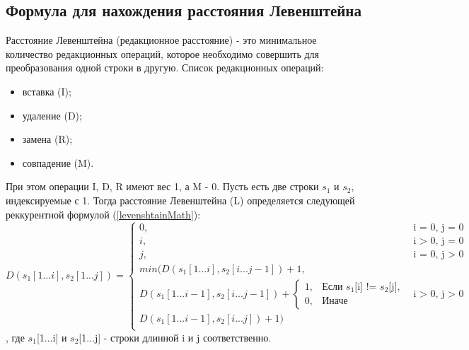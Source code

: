 \documentclass{article}
\begin{document}
		\subsection{Формула для нахождения расстояния Левенштейна}
		Расстояние Левенштейна (редакционное расстояние) - это минимальное количество редакционных операций, которое необходимо совершить для преобразования одной строки в другую.
		\newline
		\indent Список редакционных операций:
		\begin{itemize}
		\item вставка (I);
		\item удаление (D);
		\item замена (R);
		\item совпадение (M).
		\end{itemize}
		 \indent  \indent	При этом операции I, D, R имеют вес 1, а M - 0.
Пусть есть две строки $s_1$ и $s_2$, индексируемые с 1. Тогда расстояние Левенштейна (L) определяется следующей реккурентной формулой (\ref{levenshtainMath}):
			\begin{equation}\label{levenshtainMath}
			D(s_1[1...i], s_2[1...j]) = 
			\begin{cases}
			   0,  &\text{i = 0, j = 0}\\
			   i, &\text{i > 0, j = 0}\\
			   j, &\text{i = 0, j > 0}\\
			   min(D(s_1[1...i], s_2[i...j - 1]) + 1, \\
	     			    D(s_1[1...i - 1], s_2[i...j - 1]) + \begin{cases}
	     			                           1, &\text{Если $s_1$[i] != $s_2$[j]},\\0, &\text{Иначе}
	     			                           \end{cases} &\text{i > 0, j > 0}\\
			         D(s_1[1...i - 1], s_2[i...j]) + 1)\\
			         \end{cases}
			 \end{equation}, где $s_1$[1...i] и $s_2$[1...j] - строки длинной i и j соответственно.
\end{document}
